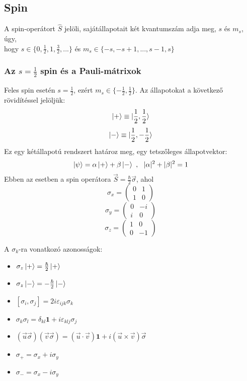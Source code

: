 \documentclass[12pt]{article}
\theoremstyle{plain}
\newcommand{\commut}[2]{\left [ #1 , #2 \right]}
\newcommand{\sigx}{\sigma_x}
\newcommand{\sigy}{\sigma_y}
\newcommand{\sigz}{\sigma_z}
\newcommand{\paulix}{
    \left( \begin{array}{cc}
        0 & 1 \\
        1 & 0
    \end{array}
    \right)
}
\newcommand{\pauliy}{
    \left( \begin{array}{cc}
        0 & -i \\
        i & 0
    \end{array}
    \right)
}
\newcommand{\pauliz}{
    \left( \begin{array}{cc}
        1 & 0 \\
        0 & -1
    \end{array}
    \right)
}
\begin{document}
\subsection{Spin}
A spin-operátort $\hat S$ jelöli, sajátállapotait két kvantumszám adja meg, $s$ és $m_s$, úgy, \\ hogy
$s\in\{0, \frac{1}{2}, 1, \frac{3}{2}, ...\}$ és $m_s \in \{-s, -s+1,...,s-1, s\}$

\subsubsection{Az $s = \frac{1}{2}$ spin és a Pauli-mátrixok}
Feles spin esetén $s=\frac{1}{2}$, ezért $m_s \in \{-\frac{1}{2},\frac{1}{2}\}$. Az állapotokat a következő rövidítéssel jelöljük:
\begin{equation}
    \ket + \equiv \ket{\frac{1}{2}, \frac{1}{2}}    
\end{equation}
\begin{equation}
    \ket - \equiv \ket{\frac{1}{2}, -\frac{1}{2}}    
\end{equation}
Ez egy kétállapotú rendszert határoz meg, egy tetszőleges állapotvektor:
\begin{equation}
    \ket\psi = \alpha\ket+ + \beta\ket- ~,~~ |\alpha|^2 + |\beta|^2 = 1    
\end{equation}
Ebben az esetben a spin operátora $\vec S = \frac{\hbar}{2}\vec{\sigma}$, ahol
\begin{equation} \sigx = \paulix \end{equation}
\begin{equation} \sigy = \pauliy \end{equation}
\begin{equation} \sigz = \pauliz \end{equation}

A $\sigma_k$-ra vonatkozó azonosságok:
\begin{itemize}
    \item $\sigz \ket+ = \frac{\hbar}{2}\ket+$
    \item $\sigz \ket- = -\frac{\hbar}{2}\ket-$    
    \item $
        \commut{\sigma_i}{\sigma_j} = 2i\varepsilon_{ijk}\sigma_k
    $
    \item $
        \sigma_k\sigma_l = \delta_{kl}\mathbf 1 + i\varepsilon_{klj}\sigma_j
    $
    \item $
        (\vec u \vec \sigma)(\vec v\vec\sigma) = (\vec u\cdot\vec v)\mathbf 1 + i(\vec u \times\vec v)\vec\sigma
    $
    \item $
        \sigma_+ = \sigx + i\sigy
    $
    \item $
        \sigma_- = \sigx - i\sigy
    $

\end{itemize}
\end{document}
